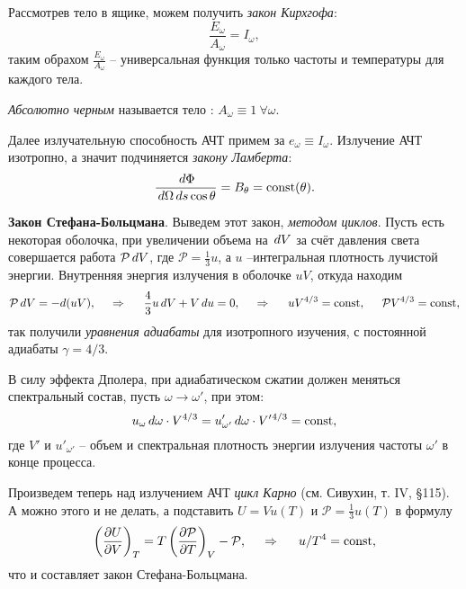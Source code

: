 Рассмотрев тело в ящике, можем получить \textit{закон Кирхгофа}:
\begin{equation}
    \frac{E_\omega}{A_\omega} =  I_\omega,
\end{equation}
таким обрахом $\frac{E_\omega}{A_\omega}$ -- универсальная функция только частоты и температуры для каждого тела. 



\begin{to_def}
    \textit{Абсолютно черным} называется тело : $A_\omega \equiv 1 \ \forall \omega$.
\end{to_def}

Далее излучательную способность АЧТ примем за $e_\omega \equiv I_\omega$. Излучение АЧТ изотропно, а значит подчиняется \textit{закону Ламберта}:
\begin{equation*}
    \frac{\, d \Phi}{\, d \Omega \, d s \cos \theta} = B_\theta = \textnormal{const}(\theta).
\end{equation*}


\textbf{Закон Стефана-Больцмана}. Выведем этот закон, \textit{методом циклов}. Пусть есть некоторая оболочка, при увеличении объема на $\, d V$ за счёт давления света совершается работа $\mathcal P \, d V$, где $\mathcal P = \frac{1}{3} u$,  а $u$ --интегральная плотность лучистой энергии. Внутренняя энергия излучения в оболочке  $uV$, откуда находим
\begin{equation*}
    \mathcal P \, d V = - d(uV),
    \hspace{0.5cm} \Rightarrow \hspace{0.5cm}
    \frac{4}{3} u \, d V + V \, d u = 0,
    \hspace{0.5cm} \Rightarrow \hspace{0.5cm}
    u V^{4/3} = \textnormal{const}, \hspace{5 mm} \mathcal P V^{4/3} = \textnormal{const},
\end{equation*}
так получили \textit{уравнения адиабаты} для изотропного изучения, с постоянной адиабаты $\gamma = 4/3$. 



В силу эффекта Дполера, при адиабатическом сжатии должен меняться спектральный состав, пусть $\omega \to \omega'$, при этом:
\begin{equation*}
    u_\omega \, d \omega \cdot V^{4/3} = u'_{\omega'} \, d \omega \cdot V'{}^{4/3} = \textnormal{const},
\end{equation*}
где $V'$ и $u'_{\omega'}$ -- объем и спектральная плотность энергии излучения частоты $\omega'$ в конце процесса. 


Произведем теперь над излучением АЧТ \textit{цикл Карно} (см. Сивухин, т. IV, \S 115).  А можно этого и не делать, а подставить $U = V u(T)$ и $\mathcal P = \frac{1}{3} u(T)$ в формулу
\begin{equation*}
    \left(\frac{\partial U}{\partial V} \right)_T = T \left(\frac{\partial \mathcal P}{\partial T} \right)_V - \mathcal P,
    \hspace{0.5cm} \Rightarrow \hspace{0.5cm}
    u/T^4 = \textnormal{const},
\end{equation*}
что и составляет закон Стефана-Больцмана. 


